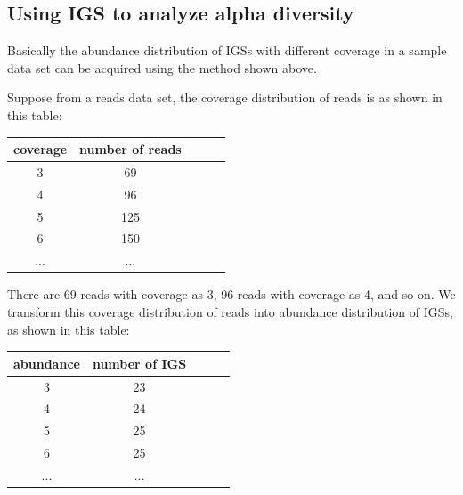 \subsection{Using IGS to analyze alpha diversity}

Basically the abundance distribution of IGSs with different coverage in a 
sample data set can be acquired using the method shown above.

Suppose from a reads data set, the coverage distribution of reads is as 
shown in this table: %
\\
\begin{tabular}{|c|c|c|c|c|}
coverage & number of reads \\
\hline 
3                   & 69  \\
4                  & 96  \\
5                  & 125 \\
6                   & 150 \\
...        & ... \\
\end{tabular}
\begin{flushleft}
\end{flushleft}

There are 69 reads with coverage as 3, 96 reads with coverage as 4, 
and so on. We transform this coverage distribution
of reads into abundance distribution of IGSs, as shown in this table: %
\\
\begin{tabular}{ |c | c |c| c|c| }
abundance & number of IGS \\
\hline 
3                   & 23  \\
4                  & 24  \\
5                  & 25 \\
6        & 25 \\
...        & ... \\
\end{tabular}
\begin{flushleft}
\end{flushleft}

